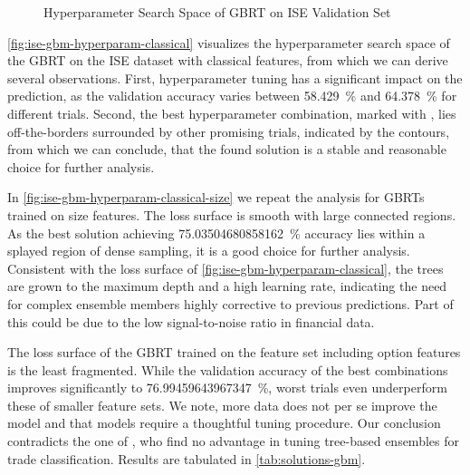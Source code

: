 \begin{figure}[!ht]
    \vfill
    \caption[Hyperparameter Search Space of Gradient Boosting]{Hyperparameter Search Space of \gls{GBRT} on \gls{ISE} Validation Set}
    \label{fig:ise-gbm-hyperparam}
\end{figure}
\clearpage
\begin{figure}[!ht]
    \ContinuedFloat
\end{figure}

\cref{fig:ise-gbm-hyperparam-classical} visualizes the hyperparameter search space of the \gls{GBRT} on the \gls{ISE} dataset with classical features, from which we can derive several observations. First, hyperparameter tuning has a significant impact on the prediction, as the validation accuracy varies between \SI{58.429}{\percent} and \SI{64.378}{\percent} for different trials. Second, the best hyperparameter combination, marked with \bestcircle, lies off-the-borders surrounded by other promising trials, indicated by the contours, from which we can conclude, that the found solution is a stable and reasonable choice for further analysis.

In \cref{fig:ise-gbm-hyperparam-classical-size} we repeat the analysis for \glspl{GBRT} trained on size features. The loss surface is smooth with large connected regions. As the best solution achieving \SI{75.03504680858162}{\percent} accuracy lies within a splayed region of dense sampling, it is a good choice for further analysis. Consistent with the loss surface of \cref{fig:ise-gbm-hyperparam-classical}, the trees are grown to the maximum depth and a high learning rate, indicating the need for complex ensemble members highly corrective to previous predictions. Part of this could be due to the low signal-to-noise ratio in financial data.

The loss surface of the \gls{GBRT} trained on the feature set including option features is the least fragmented. While the validation accuracy of the best combinations improves significantly to \SI{76.99459643967347}{\percent}, worst trials even underperform these of smaller feature sets. We note, more data does not per se improve the model and that models require a thoughtful tuning procedure. Our conclusion contradicts the one of \textcite[][14]{ronenMachineLearningTrade2022}, who find no advantage in tuning tree-based ensembles for trade classification. Results are tabulated in \cref{tab:solutions-gbm}.

